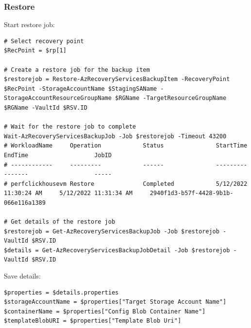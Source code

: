 \subsubsection{Restore}
\label{sec:org22dad73}
Start restore job:
\begin{verbatim}
# Select recovery point
$RecPoint = $rp[1]

# Create a restore job for the backup item
$restorejob = Restore-AzRecoveryServicesBackupItem -RecoveryPoint $RecPoint -StorageAccountName $StagingSAName -StorageAccountResourceGroupName $RGName -TargetResourceGroupName $RGName -VaultId $RSV.ID

# Wait for the restore job to complete
Wait-AzRecoveryServicesBackupJob -Job $restorejob -Timeout 43200
# WorkloadName     Operation            Status               StartTime                 EndTime                   JobID
# ------------     ---------            ------               ---------                 -------                   -----
# perfclickhousevm Restore              Completed            5/12/2022 11:30:24 AM     5/12/2022 11:31:34 AM     2940f1d3-b57f-4428-9b1b-066e116a1389

# Get details of the restore job
$restorejob = Get-AzRecoveryServicesBackupJob -Job $restorejob -VaultId $RSV.ID
$details = Get-AzRecoveryServicesBackupJobDetail -Job $restorejob -VaultId $RSV.ID
\end{verbatim}

Save details:
\begin{verbatim}
$properties = $details.properties
$storageAccountName = $properties["Target Storage Account Name"]
$containerName = $properties["Config Blob Container Name"]
$templateBlobURI = $properties["Template Blob Uri"]
\end{verbatim}

